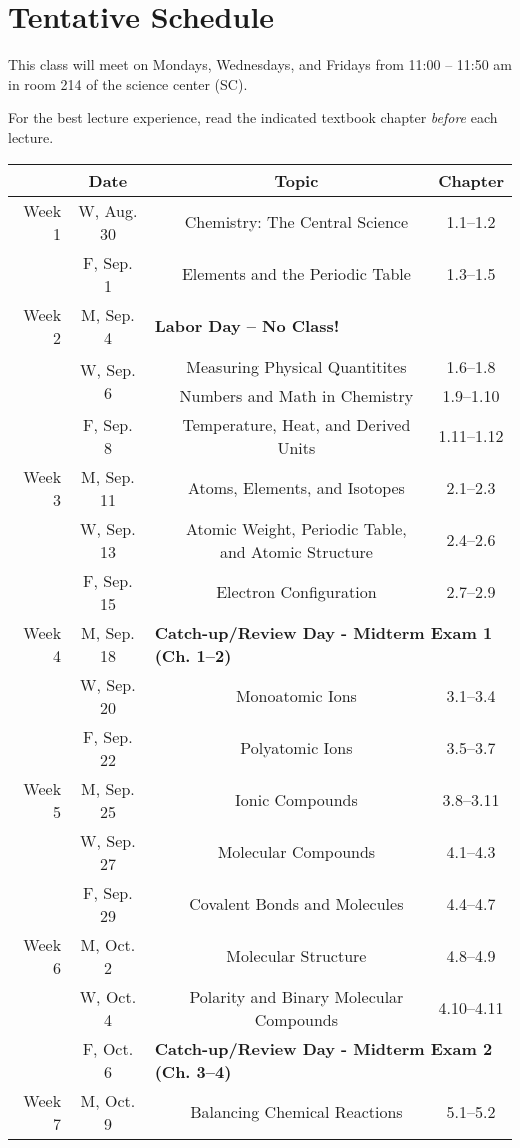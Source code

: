 \documentclass[12pt, letterpaper]{article}
\begin{document}
\section*{Tentative Schedule}
This class will meet on Mondays, Wednesdays, and Fridays from 11:00  -- 11:50
am in room 214 of the science center (SC).


\noindent For the best lecture experience, read the indicated textbook chapter \emph{before} each lecture.

\noindent
\begin{tabular}{rcccc}
	& Date && Topic & Chapter\\
	\midrule
	Week 1 & W, Aug. 30&& Chemistry: The Central Science & 1.1--1.2\\
	& F, Sep. 1&& Elements and the Periodic Table & 1.3--1.5\\
	\midrule
	Week 2 & M, Sep. 4& \multicolumn{3}{l}{\textbf{Labor Day -- No Class!}}\\
	& \multirow{2}{*}{W, Sep. 6}& & Measuring Physical Quantitites & 1.6--1.8\\
	& & & Numbers and Math in Chemistry & 1.9--1.10\\
	& F, Sep. 8&& Temperature, Heat, and Derived Units & 1.11--1.12\\
	\midrule
	Week 3 & M, Sep. 11&& Atoms, Elements, and Isotopes & 2.1--2.3\\
	& W, Sep. 13&& Atomic Weight, Periodic Table, and Atomic Structure & 2.4--2.6\\
	& F, Sep. 15&& Electron Configuration & 2.7--2.9\\
	\midrule
	Week 4 & M, Sep. 18& \multicolumn{3}{l}{\textbf{Catch-up/Review Day - Midterm Exam 1 (Ch. 1--2)}}\\
	& W, Sep. 20&& Monoatomic Ions & 3.1--3.4\\
	& F, Sep. 22&& Polyatomic Ions & 3.5--3.7\\
	\midrule
	Week 5 & M, Sep. 25&& Ionic Compounds & 3.8--3.11\\
	& W, Sep. 27&& Molecular Compounds & 4.1--4.3\\
	& F, Sep. 29&& Covalent Bonds and Molecules & 4.4--4.7\\
	\midrule
	Week 6 & M, Oct. 2&& Molecular Structure & 4.8--4.9\\
	& W, Oct. 4&& Polarity and Binary Molecular Compounds & 4.10--4.11\\
	& F, Oct. 6& \multicolumn{3}{l}{\textbf{Catch-up/Review Day - Midterm Exam 2 (Ch. 3--4)}}\\
	\midrule
	Week 7 & M, Oct. 9&& Balancing Chemical Reactions & 5.1--5.2\\

\end{tabular}
\end{document}
